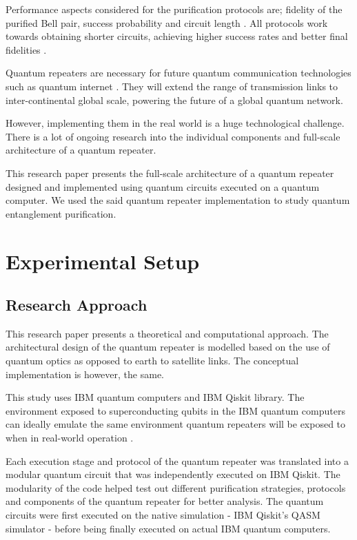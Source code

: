 \documentclass[11pt]{article}
\begin{document}
Performance aspects considered for the purification protocols are; fidelity of the purified Bell pair, success probability and circuit length \cite{Krastanov2019optimized}. All protocols work towards obtaining shorter circuits, achieving higher success rates and better final fidelities \cite{Krastanov2019optimized}.

Quantum repeaters are necessary for future quantum communication technologies such as quantum internet \cite{Gisin_2007, Briegel_1998}. They will extend the range of transmission links to inter-continental global scale, powering the future of a global quantum network.

However, implementing them in the real world is a huge technological challenge. There is a lot of ongoing research into the individual components and full-scale architecture of a quantum repeater.

This research paper presents the full-scale architecture of a quantum repeater designed and implemented using quantum circuits executed on a quantum computer. We used the said quantum repeater implementation to study quantum entanglement purification.
\section{Experimental Setup}

\subsection{Research Approach}
This research paper presents a theoretical and computational approach. The architectural design of the quantum repeater is modelled based on the use of quantum optics as opposed to earth to satellite links. The conceptual implementation is however, the same.

This study uses IBM quantum computers and IBM Qiskit library. The environment exposed to superconducting qubits in the IBM quantum computers can ideally emulate the same environment quantum repeaters will be exposed to when in real-world operation \cite{Das_2021}.

Each execution stage and protocol of the quantum repeater was translated into a modular quantum circuit that was independently executed on IBM Qiskit. The modularity of the code helped test out different purification strategies, protocols and components of the quantum repeater for better analysis. The quantum circuits were first executed on the native simulation - IBM Qiskit's QASM simulator - before being finally executed on actual IBM quantum computers.
\end{document}
